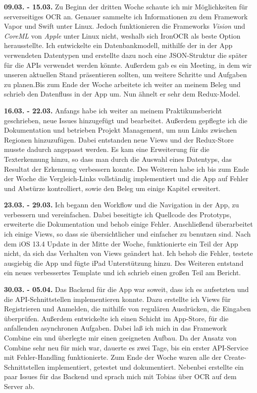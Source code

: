 \documentclass[nomenclature, onesided, 150]{HSMW-Thesis}
\begin{document}
	\textbf{09.03. - 15.03.} 
	Zu Beginn der dritten Woche schaute ich mir Möglichkeiten für serverseitiges OCR an. Genauer sammelte ich Informationen zu dem Framework Vapor und Swift unter Linux. Jedoch funktionieren die Frameworks \textit{Vision} und \textit{CoreML} von \textit{Apple} unter Linux nicht, weshalb sich IronOCR als beste Option herausstellte. Ich entwickelte ein Datenbankmodell, mithilfe der in der App verwendeten Datentypen und erstellte dazu noch eine JSON-Struktur die später für die APIs verwendet werden könnte. Außerdem gab es ein Meeting, in dem wir unseren aktuellen Stand präsentieren sollten, um weitere Schritte und Aufgaben zu planen.Bis zum Ende der Woche arbeitete ich weiter an meinem Beleg und schrieb den Datenfluss in der App um. Nun ähnelt er sehr dem Redux-Model.
	
	\textbf{16.03. - 22.03.} 
	Anfangs habe ich weiter an meinem Praktikumsbericht geschrieben, neue Issues hinzugefügt und bearbeitet. Außerdem gepflegte ich die Dokumentation und betrieben Projekt Management, um nun Links zwischen Regionen hinzuzufügen. Dabei entstanden neue Views und der Redux-Store musste dadurch angepasst werden. Es kam eine Erweiterung für die Texterkennung hinzu, so dass man durch die Auswahl eines Datentyps, das Resultat der Erkennung verbessern konnte. Des Weiteren habe ich bis zum Ende der Woche die Vergleich-Links vollständig implementiert und die App auf Fehler und Abstürze kontrolliert, sowie den Beleg um einige Kapitel erweitert.
	
	\textbf{23.03. - 29.03.} 
	Ich begann den Workflow und die Navigation in der App, zu verbessern und vereinfachen. Dabei beseitigte ich Quellcode des Prototyps, erweiterte die Dokumentation und behob einige Fehler. Anschließend überarbeitet ich einige Views, so dass sie übersichtlicher und einfacher zu benutzen sind. Nach dem iOS 13.4 Update in der Mitte der Woche, funktionierte ein Teil der App nicht, da sich das Verhalten von Views geändert hat. Ich behob die Fehler, testete ausgiebig die App und fügte iPad Unterstützung hinzu. Des Weiteren entstand ein neues verbessertes Template und ich schrieb einen großen Teil am Bericht.
	
	\textbf{30.03. - 05.04.} 
	Das Backend für die App war soweit, dass ich es aufsetzten und die API-Schnittstellen implementieren konnte. Dazu erstellte ich Views für Registrieren und Anmelden, die mithilfe von regulären Ausdrücken, die Eingaben überprüfen. Außerdem entwickelte ich einen Schicht im App-Store, für die anfallenden asynchronen Aufgaben. Dabei laß ich mich in das Framework Combine ein und überlegte mir einen geeigneten Aufbau. Da der Ansatz von Combine sehr neu für mich war, dauerte es zwei Tage, bis ein erster API-Service mit Fehler-Handling funktionierte. Zum Ende der Woche waren alle der Create-Schnittstellen implementiert, getestet und dokumentiert. Nebenbei erstellte ein paar Issues für das Backend und sprach mich mit Tobias über OCR auf dem Server ab.
	
\end{document}
